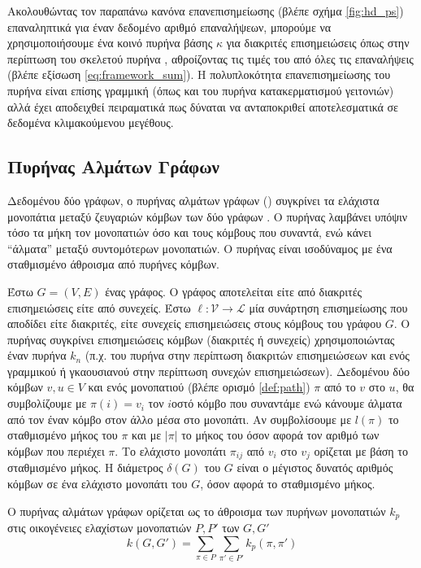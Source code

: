 Ακολουθώντας τον παραπάνω κανόνα επανεπισημείωσης (βλέπε σχήμα \ref{fig:hd_ps}) επαναληπτικά για έναν δεδομένο αριθμό επαναλήψεων, μπορούμε να χρησιμοποιήσουμε ένα κοινό πυρήνα βάσης $\kappa$ για διακριτές επισημειώσεις όπως στην περίπτωση του σκελετού πυρήνα , αθροίζοντας τις τιμές του από όλες τις επαναλήψεις (βλέπε εξίσωση \ref{eq:framework_sum}).
Η πολυπλοκότητα επανεπισημείωσης του πυρήνα  είναι επίσης γραμμική (όπως και του πυρήνα κατακερματισμού γειτονιών) αλλά έχει αποδειχθεί πειραματικά πως δύναται να ανταποκριθεί αποτελεσματικά σε δεδομένα κλιμακούμενου μεγέθους.

\subsection{Πυρήνας Αλμάτων Γράφων}
\label{ssec:gh}
Δεδομένου δύο γράφων, ο πυρήνας αλμάτων γράφων () συγκρίνει τα ελάχιστα μονοπάτια μεταξύ ζευγαριών κόμβων των δύο γράφων \cite{feragen2013scalable}.
Ο πυρήνας λαμβάνει υπόψιν τόσο τα μήκη τον μονοπατιών όσο και τους κόμβους που συναντά, ενώ κάνει ``άλματα'' μεταξύ συντομότερων μονοπατιών.
Ο πυρήνας είναι ισοδύναμος με ένα σταθμισμένο άθροισμα από πυρήνες κόμβων.\par
Έστω $G=(V,E)$ ένας γράφος.
Ο γράφος αποτελείται είτε από διακριτές επισημειώσεις είτε από συνεχείς.
Έστω $\ell : \mathcal{V} \rightarrow \mathcal{L}$ μία συνάρτηση επισημείωσης που αποδίδει είτε διακριτές, είτε συνεχείς επισημειώσεις στους κόμβους του γράφου $G$.
Ο πυρήνας συγκρίνει επισημειώσεις κόμβων (διακριτές ή συνεχείς) χρησιμοποιώντας έναν πυρήνα $k_n$ (π.χ. του πυρήνα  στην περίπτωση διακριτών επισημειώσεων και ενός γραμμικού ή γκαουσιανού στην περίπτωση συνεχών επισημειώσεων).
Δεδομένου δύο κόμβων $v,u \in V$ και ενός μονοπατιού (βλέπε ορισμό \ref{def:path}) $\pi$ από το $v$ στο $u$, θα συμβολίζουμε με $\pi(i) = v_i$ τον $i$οστό κόμβο που συναντάμε ενώ κάνουμε άλματα από τον έναν κόμβο στον άλλο μέσα στο μονοπάτι.
Αν συμβολίσουμε με $l(\pi)$ το σταθμισμένο μήκος του $\pi$ και με $|\pi|$ το μήκος του όσον αφορά τον αριθμό των κόμβων που περιέχει $\pi$.
Το ελάχιστο μονοπάτι $\pi_{ij}$ από $v_i$ στο $v_j$ ορίζεται με βάση το σταθμισμένο μήκος.
Η διάμετρος $\delta(G)$ του $G$ είναι ο μέγιστος δυνατός αριθμός κόμβων σε ένα ελάχιστο μονοπάτι του $G$, όσον αφορά το σταθμισμένο μήκος.\par
Ο πυρήνας αλμάτων γράφων ορίζεται ως το άθροισμα των πυρήνων μονοπατιών $k_p$ στις οικογένειες ελαχίστων μονοπατιών $P, P'$ των $G,G'$
\begin{equation}
    k(G,G') = \sum_{\pi \in P} \sum_{\pi' \in P'} k_p(\pi, \pi')
\end{equation}

